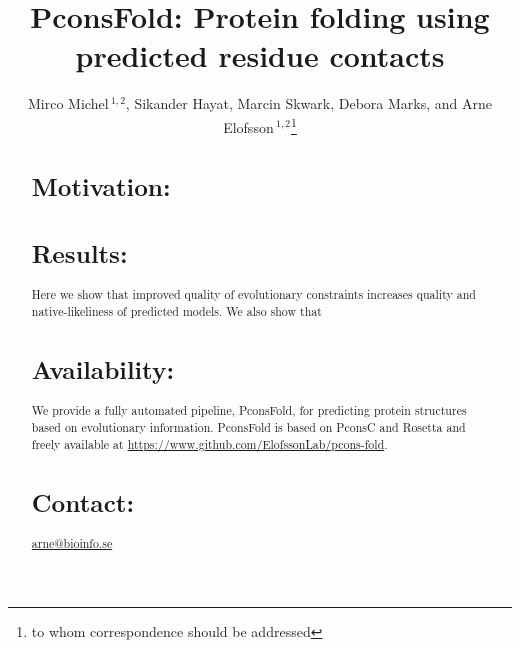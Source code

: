 \documentclass{bioinfo}
\begin{document}

\title[PconsFold]{PconsFold: Protein folding using predicted residue contacts}
\author[M.Michel \textit{et~al}]{Mirco Michel\,$^{1,2}$, Sikander Hayat, Marcin Skwark, Debora Marks, and Arne Elofsson\,$^{1,2}$\footnote{to whom correspondence should be addressed}}
\address{$^{1}$Department of Biochemistry and Biophysics, Stockholm University, 10691 Stockholm, Sweden\\
$^{2}$Science for Life Laboratory, Box 1031, 17121 Solna, Sweden}



\maketitle

\begin{abstract}

\section{Motivation:}

\section{Results:}
Here we show that improved quality of evolutionary constraints increases quality and native-likeliness of predicted models. We also show that 
\section{Availability:}
We provide a fully automated pipeline, PconsFold, for predicting protein structures based on evolutionary information. PconsFold is based on PconsC and Rosetta and freely available at \url{https://www.github.com/ElofssonLab/pcons-fold}.
\section{Contact:} \href{arne@bioinfo.se}{arne@bioinfo.se}
\end{abstract}
\end{document}

